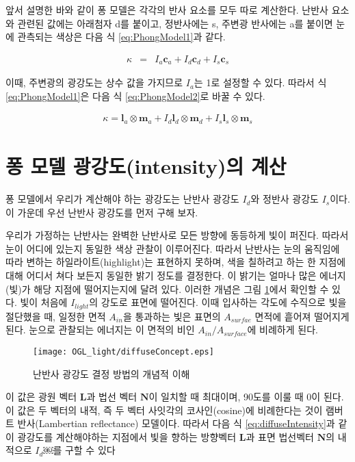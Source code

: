 앞서 설명한 바와 같이 퐁 모델은 각각의 반사 요소를 모두 따로 계산한다. 난반사 요소와 관련된 값에는 아래첨자 d를 붙이고, 정반사에는 s, 주변광 반사에는 a를 붙이면 눈에 관측되는 색상은 다음 식 \ref{eq:PhongModel1}과 같다.

\begin{eqnarray}
\label{eq:PhongModel1}
\kappa & = & I_a \mathbf c_a + I_d \mathbf c_d + I_s \mathbf c_s
\end{eqnarray}

이때, 주변광의 광강도는 상수 값을 가지므로 $I_a$는 1로 설정할 수 있다. 따라서 식 \ref{eq:PhongModel1}은 다음 식 \ref{eq:PhongModel2}로 바꿀 수 있다.

\begin{eqnarray}
\label{eq:PhongModel2}
\kappa  =  \mathbf l_a \otimes \mathbf m_a + I_d \mathbf l_d \otimes \mathbf m_d + I_s \mathbf l_s \otimes \mathbf m_s
\end{eqnarray}

\section{퐁 모델 광강도(intensity)의 계산}

퐁 모델에서 우리가 계산해야 하는 광강도는 난반사 광강도 $I_d$와 정반사 광강도  $I_s$이다. 
이 가운데 우선 난반사 광강도를 먼저 구해 보자.


우리가 가정하는 난반사는 완벽한 난반사로 모든 방향에 동등하게 빛이 퍼진다. 따라서 눈이 어디에 있는지 동일한 색상 관찰이 이루어진다. 따라서 난반사는 눈의 움직임에 따라 변하는 하일라이트(highlight)는 표현하지 못하며, 색을 칠하려고 하는 한 지점에 대해 어디서 쳐다 보든지 동일한 밝기 정도를 결정한다. 이 밝기는 얼마나 많은 에너지(빛)가 해당 지점에 떨어지는지에 달려 있다. 이러한 개념은 그림 \ref{fig:OGL_light:diffuseConcept}에서 확인할 수 있다. 빛이 처음에 $I_{light}$의 강도로 표면에 떨어진다. 이때 
입사하는 각도에 수직으로 빛을 절단했을 때, 일정한 면적 $A_{in}$을 통과하는 빛은 표면의 $A_{surfae}$ 면적에 흩어져 떨어지게 된다.
눈으로 관찰되는 에너지는 이 면적의 비인 $A_{in}/A_{surface}$에 비례하게 된다.

\begin{figure}[h!]
  \centering
    \texttt{[image: OGL\_light/diffuseConcept.eps]}
    \caption{난반사 광강도 결정 방법의 개념적 이해}
    \label{fig:OGL_light:diffuseConcept}
\end{figure}

이 값은 광원 벡터 $\mathbf L$과 법선 벡터 $\mathbf N$이 일치할 때 최대이며, 90도를 이룰 때 0이 된다. 이 값은 두 벡터의 내적, 
즉 두 벡터 사잇각의 코사인(cosine)에 비례한다는 것이 램버트 반사(Lambertian reflectance) 모델이다. 
따라서 다음 식 \ref{eq:diffuseIntensity}과 같이 광강도를 계산해야하는 지점에서 빛을 향하는 방향벡터 $\mathbf L$과 
표면 법선벡터 $\mathbf N$의 내적으로  $I_d$￼를 구할 수 있다

